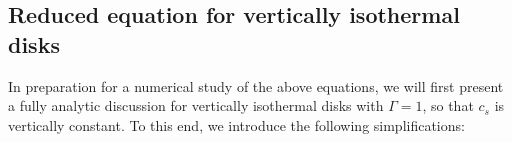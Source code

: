 \subsection{Reduced equation for vertically isothermal disks}

In preparation for a numerical study of the above equations, we will 
first present a fully analytic discussion for vertically isothermal disks with
$\Gamma=1$, so that $c_s$ is vertically constant. To this end, 
we introduce the following simplifications:

